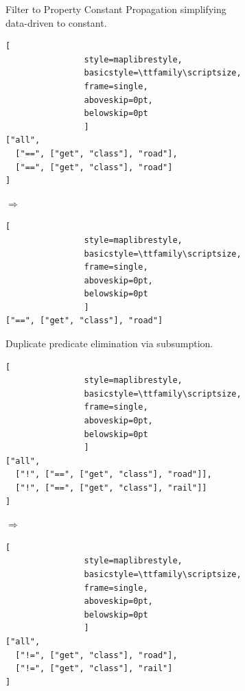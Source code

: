 \begin{figure}[ht]
\begin{subfigure}[t]{\linewidth}
		\caption{
Filter to Property Constant Propagation simplifying data-driven to constant.}
		\label{fig:expr_b}
	\end{subfigure}

	\vspace{4mm}

	\begin{subfigure}[t]{\linewidth}
		\centering

		\begin{minipage}[c]{0.45\linewidth}
			\centering
			\begin{lstlisting}[
				style=maplibrestyle,
				basicstyle=\ttfamily\scriptsize,
				frame=single,
				aboveskip=0pt,
				belowskip=0pt
				]
["all",
  ["==", ["get", "class"], "road"],
  ["==", ["get", "class"], "road"]
]\end{lstlisting}
		\end{minipage}
		\hfill
		\begin{minipage}[c]{0.08\linewidth}
			\centering
			\vfill
			{\Huge$\Longrightarrow$}
			\vfill
		\end{minipage}
		\hfill
		\begin{minipage}[c]{0.45\linewidth}
			\centering
			\begin{lstlisting}[
				style=maplibrestyle,
				basicstyle=\ttfamily\scriptsize,
				frame=single,
				aboveskip=0pt,
				belowskip=0pt
				]
["==", ["get", "class"], "road"]\end{lstlisting}
		\end{minipage}

		\caption{
Duplicate predicate elimination via subsumption.}
		\label{fig:expr_c}
	\end{subfigure}

	\vspace{4mm}

	\begin{subfigure}[t]{\linewidth}
		\centering

		\begin{minipage}[c]{0.45\linewidth}
			\centering
			\begin{lstlisting}[
				style=maplibrestyle,
				basicstyle=\ttfamily\scriptsize,
				frame=single,
				aboveskip=0pt,
				belowskip=0pt
				]
["all",
  ["!", ["==", ["get", "class"], "road"]],
  ["!", ["==", ["get", "class"], "rail"]]
]\end{lstlisting}
		\end{minipage}
		\hfill
		\begin{minipage}[c]{0.08\linewidth}
			\centering
			\vfill
			{\Huge$\Longrightarrow$}
			\vfill
		\end{minipage}
		\hfill
		\begin{minipage}[c]{0.45\linewidth}
			\centering
			\begin{lstlisting}[
				style=maplibrestyle,
				basicstyle=\ttfamily\scriptsize,
				frame=single,
				aboveskip=0pt,
				belowskip=0pt
				]
["all",
  ["!=", ["get", "class"], "road"],
  ["!=", ["get", "class"], "rail"]
]\end{lstlisting}
		\end{minipage}


\end{subfigure}
\end{figure}

